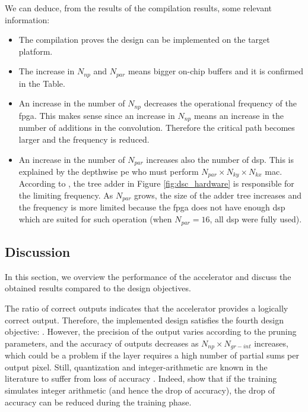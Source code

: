 We can deduce, from the results of the compilation results, some relevant information:
\begin{itemize}
    \item The compilation proves the design can be implemented on the target platform.
    \item The increase in $N_{np}$ and $N_{par}$ means bigger on-chip buffers and it is confirmed in the Table.
    \item An increase in the number of $N_{np}$ decreases the operational frequency of the \acrshort{fpga}. This makes sense since an increase in $N_{np}$ means an increase in the number of additions in the convolution. Therefore the critical path becomes larger and the frequency is reduced.
    \item An increase in the number of $N_{par}$ increases also the number of \acrshort{dsp}. This is explained by the depthwise \acrshort{pe} who must perform $N_{par} \times N_{ky} \times N_{kx}$ \acrshort{mac}. According to \textcite{bai_cnn_2018}, the tree adder in Figure \ref{fig:dsc_hardware} is responsible for the limiting frequency. As $N_{par}$ grows, the size of the adder tree increases and the frequency is more limited because the \acrshort{fpga} does not have enough \acrshort{dsp} which are suited for such operation (when $N_{par} = 16$, all \acrshort{dsp} were fully used).
\end{itemize}
%
\subsection{Discussion} \label{subs:discus}
%
In this section, we overview the performance of the accelerator and discuss the obtained results compared to the design objectives.

The ratio of correct outputs indicates that the accelerator provides a logically correct output. Therefore, the implemented design satisfies the fourth design objective: . However, the precision of the output varies according to the pruning parameters, and the accuracy of outputs decreases as $N_{np} \times N_{gr-int}$ increases, which could be a problem if the layer requires a high number of partial sums per output pixel. Still, quantization and integer-arithmetic are known in the literature to suffer from loss of accuracy \cite{wu_quantized_2016, jacob_quantization_2017}. Indeed, \textcite{wu_quantized_2016, jacob_quantization_2017} show that if the training simulates integer arithmetic (and hence the drop of accuracy), the drop of accuracy can be reduced during the training phase.

